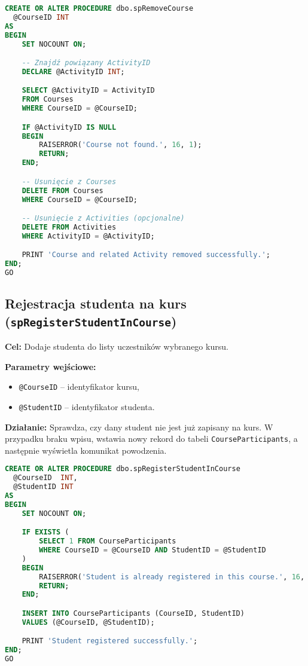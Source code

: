 \documentclass[12pt]{article}
\begin{document}
\begin{lstlisting}[language=SQL]
CREATE OR ALTER PROCEDURE dbo.spRemoveCourse
  @CourseID INT
AS
BEGIN
    SET NOCOUNT ON;

    -- Znajdź powiązany ActivityID
    DECLARE @ActivityID INT;

    SELECT @ActivityID = ActivityID
    FROM Courses
    WHERE CourseID = @CourseID;

    IF @ActivityID IS NULL
    BEGIN
        RAISERROR('Course not found.', 16, 1);
        RETURN;
    END;

    -- Usunięcie z Courses
    DELETE FROM Courses
    WHERE CourseID = @CourseID;

    -- Usunięcie z Activities (opcjonalne)
    DELETE FROM Activities
    WHERE ActivityID = @ActivityID;

    PRINT 'Course and related Activity removed successfully.';
END;
GO
\end{lstlisting}

\newpage
\subsection{Rejestracja studenta na kurs (\texttt{spRegisterStudentInCourse})}
\textbf{Cel:} Dodaje studenta do listy uczestników wybranego kursu.

\textbf{Parametry wejściowe:}
\begin{itemize}
  \item \texttt{@CourseID} – identyfikator kursu,
  \item \texttt{@StudentID} – identyfikator studenta.
\end{itemize}

\textbf{Działanie:} Sprawdza, czy dany student nie jest już zapisany na kurs. W przypadku braku wpisu, wstawia nowy rekord do tabeli \verb|CourseParticipants|, a następnie wyświetla komunikat powodzenia.

\begin{lstlisting}[language=SQL]
CREATE OR ALTER PROCEDURE dbo.spRegisterStudentInCourse
  @CourseID  INT,
  @StudentID INT
AS
BEGIN
    SET NOCOUNT ON;

    IF EXISTS (
        SELECT 1 FROM CourseParticipants
        WHERE CourseID = @CourseID AND StudentID = @StudentID
    )
    BEGIN
        RAISERROR('Student is already registered in this course.', 16, 1);
        RETURN;
    END;

    INSERT INTO CourseParticipants (CourseID, StudentID)
    VALUES (@CourseID, @StudentID);

    PRINT 'Student registered successfully.';
END;
GO
\end{lstlisting}
\newpage
\end{document}
